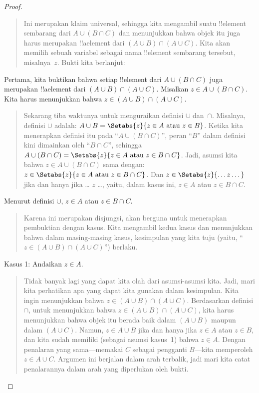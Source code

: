 \documentclass[../../../include/open-logic-section]{subfiles}
\begin{document}
\begin{proof}
\begin{quote}
Ini merupakan klaim universal, sehingga kita mengambil suatu
!!{element} sembarang dari $A \cup (B \cap C)$ dan menunjukkan bahwa
objek itu juga harus merupakan !!a{element} dari $(A \cup B) \cap (A
\cup C)$. Kita akan memilih sebuah variabel sebagai nama !!{element}
sembarang tersebut, misalnya~$z$. Bukti kita berlanjut:
\end{quote}
Pertama, kita buktikan bahwa setiap !!{element} dari $A \cup (B \cap
C)$ juga merupakan !!a{element} dari $(A \cup B) \cap (A \cup C)$.
Misalkan $z \in A \cup (B \cap C)$. Kita harus menunjukkan bahwa $z
\in (A \cup B) \cap (A \cup C)$.
\begin{quote}
Sekarang tiba waktunya untuk menguraikan definisi $\cup$ dan~$\cap$.
Misalnya, definisi $\cup$ adalah: $A \cup B = \Setabs{z}{z \in A
  \text{ atau } z \in B}$. Ketika kita menerapkan definisi itu pada
``$A \cup (B \cap C)$'', peran ``$B$'' dalam definisi kini dimainkan
oleh ``$B \cap C$'', sehingga $A \cup (B \cap C) =
\Setabs{z}{z \in A \text{ atau } z \in B \cap C}$. Jadi, asumsi kita
bahwa $z \in A \cup (B \cap C)$ sama dengan: $z \in
\Setabs{z}{z \in A \text{ atau } z \in B \cap C}$. Dan $z \in
\Setabs{z}{\dots z\dots}$ jika dan hanya jika \dots{} $z$ \dots,
yaitu, dalam kasus ini, $z \in A$ atau $z \in B \cap C$.
\end{quote}
Menurut definisi $\cup$, $z \in A$ atau $z \in B \cap C$.
\begin{quote}
Karena ini merupakan disjungsi, akan berguna untuk menerapkan
pembuktian dengan kasus. Kita mengambil kedua kasus dan menunjukkan
bahwa dalam masing-masing kasus, kesimpulan yang kita tuju (yaitu, ``$z
\in (A \cup B) \cap (A \cup C)$'') berlaku.
\end{quote}
Kasus 1: Andaikan $z \in A$.
\begin{quote}
Tidak banyak lagi yang dapat kita olah dari asumsi-asumsi kita. Jadi,
mari kita perhatikan apa yang dapat kita gunakan dalam kesimpulan.
Kita ingin menunjukkan bahwa $z \in (A \cup B) \cap (A \cup C)$.
Berdasarkan definisi $\cap$, untuk menunjukkan bahwa $z \in (A \cup
B) \cap (A \cup C)$, kita harus menunjukkan bahwa objek itu berada
baik dalam $(A \cup B)$ maupun dalam $(A \cup C)$. Namun, $z \in A \cup B$
jika dan hanya jika $z \in A$ atau $z \in B$, dan kita sudah memiliki
(sebagai asumsi kasus~1) bahwa $z \in A$. Dengan penalaran yang
sama---memakai $C$ sebagai pengganti $B$---kita memperoleh $z \in A \cup C$.
Argumen ini berjalan dalam arah terbalik, jadi mari kita catat
penalarannya dalam arah yang diperlukan oleh bukti.
\end{quote}

\end{proof}
\end{document}
